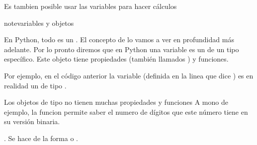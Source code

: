 \documentclass[a5paper,9pt,spanish]{sphinxmanual}
\begin{document}
\sphinxAtStartPar
Es tambien posible usar las variables para hacer cálculos

\begin{sphinxVerbatim}[commandchars=\\\{\}]
  
  
    

\end{sphinxVerbatim}

\begin{sphinxadmonition}{note}{variables y objetos}

\sphinxAtStartPar
En Python, todo es un . El concepto de  lo vamos a ver en profundidad más adelante.
Por lo pronto diremos que en Python una variable es un  de un tipo específico.
Este objeto tiene propiedades (también llamados ) y funciones.
\end{sphinxadmonition}

\sphinxAtStartPar
Por ejemplo, en el código anterior la variable  (definida en la linea que dice
) es en realidad un  de tipo .

\sphinxAtStartPar
Los objetos de tipo  no tienen muchas propiedades y funciones
A mono de ejemplo, la funcion  permite saber el numero
de dígitos que este número tiene en su versión binaria.

\begin{sphinxVerbatim}[commandchars=\\\{\}]
  
 
  
\end{sphinxVerbatim}

\sphinxAtStartPar
{}.
Se hace de la forma  o .
\end{document}
